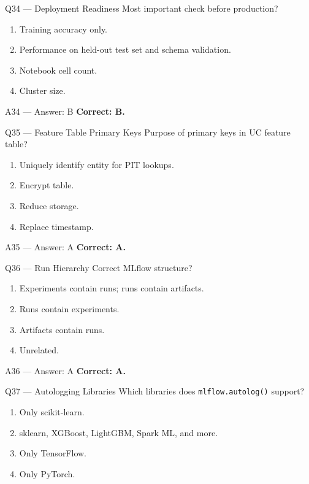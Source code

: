 \documentclass[aspectratio=169,9pt]{beamer}
\begin{document}
	\begin{frame}{Q34 — Deployment Readiness}
		Most important check before production?
		\begin{enumerate}[label=\Alph*.]
			\item Training accuracy only.
			\item Performance on held-out test set and schema validation.
			\item Notebook cell count.
			\item Cluster size.
		\end{enumerate}
	\end{frame}
	
	\begin{frame}{A34 — Answer: B}
		\textbf{Correct: B.}
	\end{frame}
	
	\begin{frame}{Q35 — Feature Table Primary Keys}
		Purpose of primary keys in UC feature table?
		\begin{enumerate}[label=\Alph*.]
			\item Uniquely identify entity for PIT lookups.
			\item Encrypt table.
			\item Reduce storage.
			\item Replace timestamp.
		\end{enumerate}
	\end{frame}
	
	\begin{frame}{A35 — Answer: A}
		\textbf{Correct: A.}
	\end{frame}
	
	\begin{frame}{Q36 — Run Hierarchy}
		Correct MLflow structure?
		\begin{enumerate}[label=\Alph*.]
			\item Experiments contain runs; runs contain artifacts.
			\item Runs contain experiments.
			\item Artifacts contain runs.
			\item Unrelated.
		\end{enumerate}
	\end{frame}
	
	\begin{frame}{A36 — Answer: A}
		\textbf{Correct: A.}
	\end{frame}
	
	\begin{frame}{Q37 — Autologging Libraries}
		Which libraries does \texttt{mlflow.autolog()} support?
		\begin{enumerate}[label=\Alph*.]
			\item Only scikit-learn.
			\item sklearn, XGBoost, LightGBM, Spark ML, and more.
			\item Only TensorFlow.
			\item Only PyTorch.
		\end{enumerate}
	\end{frame}
	
\end{document}
